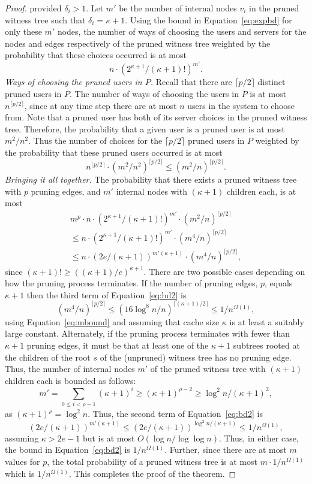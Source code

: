 \documentclass[conference]{IEEEtran}
\begin{document}
\begin{proof}
provided $\delta_i > 1$.
Let $m'$ be the number of internal nodes $v_i$ in the pruned witness tree
such that $\delta_i = \kappa + 1$. Using the bound in Equation~\ref{eq:expbd}
for only these $m'$ nodes, the number of ways of choosing the users
and servers for the nodes and edges respectively of the pruned witness tree
weighted by the probability that these choices occurred is at most $$n \cdot (2^{\kappa+1} / (\kappa+1)!)^{m'}.$$
{\em Ways of choosing the pruned users in $P$.} Recall that there are $\lceil p/2 \rceil$ distinct pruned users  in $P$. The number of ways of choosing the users in $P$ is at
most ${n^{\lceil p/2 \rceil}}$, since at any time step there are at most $n$ users in the system to choose from. Note that a pruned user has both of its
server choices in the pruned witness tree. Therefore, the probability that a given user is a pruned user is at most $ m^2/
n^2.$ Thus the number of choices for the
$\lceil p/2 \rceil$ pruned users in $P$ weighted by the probability
that these pruned users occurred is at most
$${n^{\lceil p/2\rceil}} \cdot (m^2 / n^2)^{\lceil p/2
\rceil}
\leq (m^2/ n)^{\lceil p/2 \rceil}.$$
{\em Bringing it all together.} The probability that
there exists a pruned
witness tree with $p$ pruning edges, and $m'$ internal nodes with $(\kappa+1)$ children each, is at most
\begin{eqnarray}
m^ {p} \cdot  n \cdot (2^{\kappa+1} / (\kappa+1)!)^{m'} \cdot  (m^2/ n)^{\lceil p/2 \rceil} \nonumber \\
\leq n \cdot
(2^{\kappa+1} / (\kappa+1)!)^{m'}  \cdot (m^4 /n)^{\lceil p/2 \rceil} \nonumber  \\
\leq n \cdot (2e / (\kappa+1))^{m' (\kappa + 1)}  \cdot (m^4 /n)^{\lceil p/2 \rceil}, 
 \label{eq:bd2}
\end{eqnarray}
since $(\kappa + 1)! \geq ((\kappa + 1)/e)^{\kappa + 1}$.
There are two possible cases depending on how the pruning process terminates. If the number of pruning edges, $p$, equals $\kappa + 1$ then the third term of Equation~\ref{eq:bd2} is 
$$(m^4 /n)^{\lceil p/2 \rceil} \leq (16\log^8 n /n)^{\lceil (\kappa + 1)/2 \rceil} \leq 1/ n^{\Omega(1)},$$
using Equation~\ref{eq:mbound} and assuming that cache size $\kappa$ is at least  a suitably large constant.
Alternately, if the pruning process terminates with fewer than $\kappa + 1$ pruning edges, it must be that at least one of the $\kappa + 1$ subtrees rooted at the children of the root $s$ of the 
(unpruned) witness tree has no pruning edge. Thus, the number of internal nodes $m'$ of the pruned witness tree with $(\kappa + 1)$ children  each is bounded as follows:
$$m' = \sum_{0 \leq i < \rho -1 } (\kappa + 1)^i \geq (\kappa + 1)^{\rho - 2} \geq \log^2 n / (\kappa + 1)^2,$$ 
as $(\kappa + 1)^\rho = \log^2 n$. Thus, the second term of Equation~\ref{eq:bd2} is 
$$(2e / (\kappa+1))^{m' (\kappa + 1)}\leq (2e / (\kappa+1))^{\log^2 n/ (\kappa + 1)} \leq 1/n^{\Omega(1)},$$ 
assuming $\kappa > 2e -1$  but is at most $O(\log n/\log\log n)$.
Thus, in either case, the bound in
Equation~\ref{eq:bd2} is $1/n^{\Omega(1)}$. Further, since there
are at most
$m$ values for $p$, the total probability of a pruned
witness tree is at most
$m \cdot 1/n^{\Omega(1)}$ which is
$1/n^{\Omega(1)}$. This completes the proof of the theorem. 
\end{proof}
\end{document}
